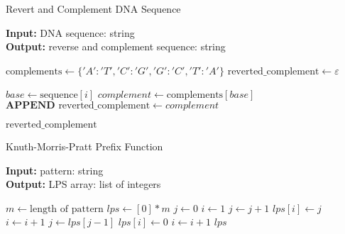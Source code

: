 \begin{algorithm}[H]
\caption{Revert and Complement DNA Sequence}
\hspace*{\algorithmicindent} \textbf{Input: } DNA sequence: string \\
\hspace*{\algorithmicindent} \textbf{Output: } reverse and complement sequence: string
\begin{algorithmic}[1]


\STATE $\text{complements} \gets \{ 'A': 'T', 'C': 'G', 'G': 'C', 'T': 'A' \}$
\STATE $\text{reverted\_complement} \gets \varepsilon$

    \STATE $base \gets \text{sequence}[i]$
    \STATE $complement \gets \text{complements}[base]$
    \STATE $\textbf{APPEND} \text{ reverted\_complement} \gets complement$
\ENDFOR

\RETURN $\text{reverted\_complement}$
\end{algorithmic}
\end{algorithm}


\begin{algorithm}[H]
\caption{Knuth-Morris-Pratt Prefix Function}
\hspace*{\algorithmicindent} \textbf{Input: } pattern: string \\
\hspace*{\algorithmicindent} \textbf{Output: } LPS array: list of integers

\begin{algorithmic}[1]
\STATE $m \gets \text{length of pattern}$
\STATE $lps \gets [0] * m$ 
\STATE $j \gets 0$ 
\STATE $i \gets 1$
        \STATE $j \gets j + 1$
        \STATE $lps[i] \gets j$
        \STATE $i \gets i + 1$
    \ELSE
            \STATE $j \gets lps[j - 1]$
        \ELSE
            \STATE $lps[i] \gets 0$
            \STATE $i \gets i + 1$
        \ENDIF
    \ENDIF
\ENDWHILE
\RETURN $lps$
\end{algorithmic}
\end{algorithm}

